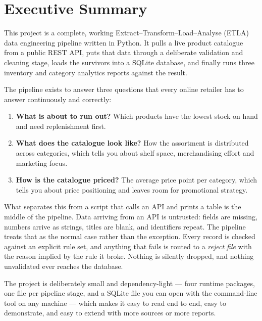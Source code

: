 
\section{Executive Summary}

This project is a complete, working Extract--Transform--Load--Analyse (ETLA)
data engineering pipeline written in Python. It pulls a live product catalogue
from a public REST API, puts that data through a deliberate validation and
cleaning stage, loads the survivors into a SQLite database, and finally runs
three inventory and category analytics reports against the result.

The pipeline exists to answer three questions that every online retailer has
to answer continuously and correctly:

\begin{enumerate}
  \item \textbf{What is about to run out?} Which products have the lowest
        stock on hand and need replenishment first.
  \item \textbf{What does the catalogue look like?} How the assortment is
        distributed across categories, which tells you about shelf space,
        merchandising effort and marketing focus.
  \item \textbf{How is the catalogue priced?} The average price point per
        category, which tells you about price positioning and leaves room for
        promotional strategy.
\end{enumerate}

What separates this from a script that calls an API and prints a table is the
middle of the pipeline. Data arriving from an API is untrusted: fields are
missing, numbers arrive as strings, titles are blank, and identifiers repeat.
The pipeline treats that as the normal case rather than the exception. Every
record is checked against an explicit rule set, and anything that fails is
routed to a \emph{reject file} with the reason implied by the rule it broke.
Nothing is silently dropped, and nothing unvalidated ever reaches the
database.

The project is deliberately small and dependency-light --- four runtime
packages, one file per pipeline stage, and a SQLite file you can open with
the  command-line tool on any machine --- which makes it easy
to read end to end, easy to demonstrate, and easy to extend with more
sources or more reports.

